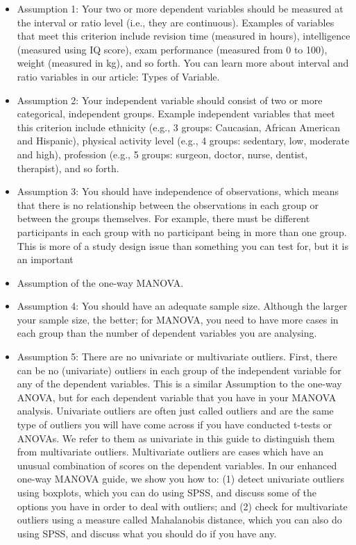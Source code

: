 \documentclass[12pt]{article} %
\begin{document}
\begin{itemize}
\item Assumption 1: Your two or more dependent variables should be measured at the interval or ratio level (i.e., they are continuous). Examples of variables that meet this criterion include revision time (measured in hours), intelligence (measured using IQ score), exam performance (measured from 0 to 100), weight (measured in kg), and so forth. You can learn more about interval and ratio variables in our article: Types of Variable.
\item Assumption 2: Your independent variable should consist of two or more categorical, independent groups. Example independent variables that meet this criterion include ethnicity (e.g., 3 groups: Caucasian, African American and Hispanic), physical activity level (e.g., 4 groups: sedentary, low, moderate and high), profession (e.g., 5 groups: surgeon, doctor, nurse, dentist, therapist), and so forth.
\item Assumption 3: You should have independence of observations, which means that there is no relationship between the observations in each group or between the groups themselves. For example, there must be different participants in each group with no participant being in more than one group. This is more of a study design issue than something you can test for, but it is an important \item Assumption of the one-way MANOVA.
\item Assumption 4: You should have an adequate sample size. Although the larger your sample size, the better; for MANOVA, you need to have more cases in each group than the number of dependent variables you are analysing.
\item Assumption 5: There are no univariate or multivariate outliers. First, there can be no (univariate) outliers in each group of the independent variable for any of the dependent variables. This is a similar  Assumption to the one-way ANOVA, but for each dependent variable that you have in your MANOVA analysis. Univariate outliers are often just called outliers and are the same type of outliers you will have come across if you have conducted t-tests or ANOVAs. We refer to them as univariate in this guide to distinguish them from multivariate outliers. Multivariate outliers are cases which have an unusual combination of scores on the dependent variables. In our enhanced one-way MANOVA guide, we show you how to: (1) detect univariate outliers using boxplots, which you can do using SPSS, and discuss some of the options you have in order to deal with outliers; and (2) check for multivariate outliers using a measure called Mahalanobis distance, which you can also do using SPSS, and discuss what you should do if you have any.

\end{itemize}
\end{document}
